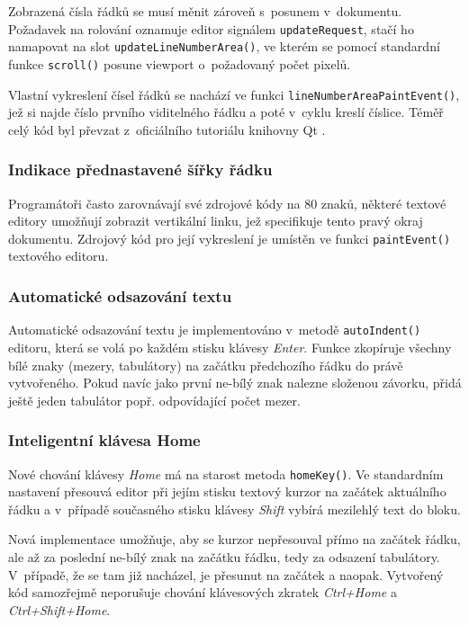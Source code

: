 \documentclass[11pt,twoside,a4paper]{book}
\begin{document}
Zobrazená čísla řádků se musí měnit zároveň s~posunem v~dokumentu. Požadavek na rolování oznamuje editor signálem \texttt{updateRequest}, stačí ho namapovat na slot \texttt{up\-da\-te\-Li\-ne\-Num\-ber\-A\-re\-a()}, ve kterém se pomocí standardní funkce \texttt{scroll()} posune viewport o~požadovaný počet pixelů.

Vlastní vykreslení čísel řádků se nachází ve funkci \texttt{lineNumberAreaPaintEvent()}, jež si najde číslo prvního viditelného řádku a poté v~cyklu kreslí číslice. Téměř celý kód byl převzat z~oficiálního tutoriálu knihovny Qt \cite{code_editor_example}.


\subsubsection{Indikace přednastavené šířky řádku}

Programátoři často zarovnávají své zdrojové kódy na 80 znaků, některé textové editory umožňují zobrazit vertikální linku, jež specifikuje tento pravý okraj dokumentu. Zdrojový kód pro její vykreslení je umístěn ve funkci \texttt{paintEvent()} textového editoru.


\subsubsection{Automatické odsazování textu}

Automatické odsazování textu je implementováno v~metodě \texttt{autoIndent()} editoru, která se volá po každém stisku klávesy \textit{Enter}. Funkce zkopíruje všechny bílé znaky (mezery, tabulátory) na začátku předchozího řádku do právě vytvořeného. Pokud navíc jako první ne-bílý znak nalezne složenou závorku, přidá ještě jeden tabulátor popř. odpovídající počet mezer.


\subsubsection{Inteligentní klávesa Home}

Nové chování klávesy \textit{Home} má na starost metoda \texttt{homeKey()}. Ve standardním nastavení přesouvá editor při jejím stisku textový kurzor na začátek aktuálního řádku a v~případě současného stisku klávesy \textit{Shift} vybírá mezilehlý text do bloku.

Nová implementace umožňuje, aby se kurzor nepřesouval přímo na začátek řádku, ale až za poslední ne-bílý znak na začátku řádku, tedy za odsazení tabulátory. V~případě, že se tam již nacházel, je přesunut na začátek a naopak. Vytvořený kód samozřejmě neporušuje chování klávesových zkratek \textit{Ctrl+Home} a \textit{Ctrl+Shift+Home}.
\end{document}
